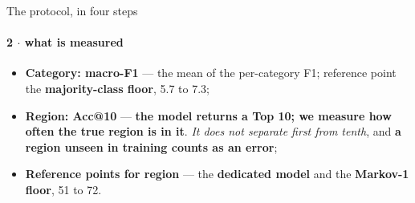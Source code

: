 \documentclass{beamer}
\begin{document}
\begin{frame}{The protocol, in four steps}
    \framesubtitle{2 $\cdot$ what is measured}

    \begin{itemize}\setlength{\itemsep}{2ex}
        \item \textbf{Category: macro-F1} --- the mean of the per-category F1; reference point the
              \textbf{majority-class floor}, \alert{5.7 to 7.3};
        \item \textbf{Region: Acc@10} --- \textbf{the model returns a Top 10; we measure how often
              the true region is in it}. \emph{It does not separate first from tenth}, and
              \textbf{a region unseen in training counts as an error};
        \item \textbf{Reference points for region} --- the \textbf{dedicated model} and the
              \textbf{Markov-1 floor}, \alert{51 to 72}.
    \end{itemize}
\end{frame}
\end{document}
